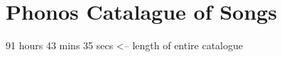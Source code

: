 \chapter{Phonos Catalague of Songs} %

\label{Chapter4} %


91 hours 43 mins 35 secs  <-- length of entire catalogue